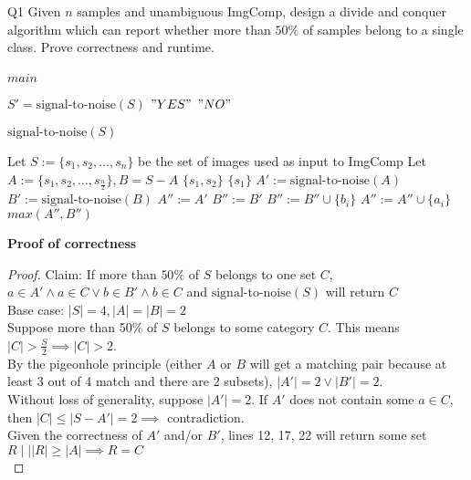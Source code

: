 \begin{problem}
  {Q1}
  Given $n$ samples and unambiguous ImgComp, design a divide and conquer algorithm which can report whether more than
  $50\%$ of samples belong to a single class. Prove correctness and runtime. \\\\
  \noindent
  $main$
  \begin{algorithmic}[1]
      \STATE $S' = \text{signal-to-noise}(S)$
      \RETURN $"YES"$
      \ELSE
      \RETURN $"NO"$
      \ENDIF
  \end{algorithmic}
  \noindent
  $\text{signal-to-noise}(S)$
  \begin{algorithmic}[1]
      \STATE Let $S := \{s_1, s_2, \dots, s_n\}$ be the set of images used as input to ImgComp
      \STATE Let $A := \{s_1, s_2, \dots, s_\frac{n}{2}\}, B = S - A$
      \RETURN $\{s_1, s_2\}$
      \RETURN $\{s_1\}$
      \ELSE
      \STATE $A' := \text{signal-to-noise}(A)$
      \STATE $B' := \text{signal-to-noise}(B)$
      \STATE $A'' := A'$
      \STATE $B'' := B'$
      \STATE $B'' := B'' \cup \{b_i\}$
      \ENDIF
      \ENDFOR
      \STATE $A'' := A'' \cup \{a_i\}$
      \ENDIF
      \ENDFOR
      \RETURN $max(A'', B'')$
      \ENDIF
  \end{algorithmic}
  \noindent
  \textbf{Proof of correctness}
  \begin{proof}
    Claim: If more than $50\%$ of $S$ belongs to one set $C$, $a \in A' \land a \in C \lor b \in B' \land b \in C$ and $\text{signal-to-noise}(S)$ will return $C$ \\
    Base case: $|S| = 4, |A| = |B| = 2$ \\
    Suppose more than 50\% of $S$ belongs to some category $C$. This means $|C| > \frac{S}{2} \implies |C| > 2$. \\
    By the pigeonhole principle (either $A$ or $B$ will get a matching pair because at least 3 out of 4 match and there are 2 subsets), $|A'| = 2 \lor |B'| = 2$. \\
    Without loss of generality, suppose $|A'| = 2$. If $A'$ does not contain some $a \in C$, then $|C| \leq |S - A'| = 2 \implies $ contradiction. \\
    Given the correctness of $A'$ and/or $B'$, lines 12, 17, 22 will return some set $R \mid| |R| \geq |A| \implies R = C$\\

\end{proof}
\end{problem}
